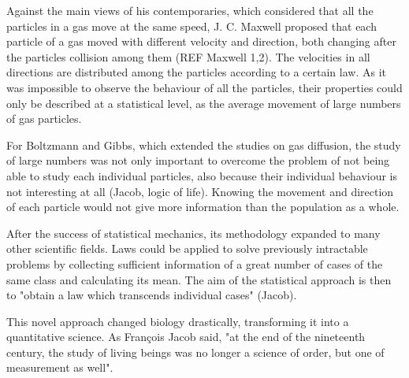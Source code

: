 Against the main views of his contemporaries, which considered that all the particles in a gas move at the same speed, J. C. Maxwell proposed that each particle of a gas moved with different velocity and direction, both changing after the particles collision among them (REF Maxwell 1,2).
The velocities in all directions are distributed among the particles according to a certain law. As it was impossible to observe the behaviour of all the particles, their properties could only be described at a statistical level, as the average movement of large numbers of gas particles.

For Boltzmann and Gibbs, which extended the studies on gas diffusion, the study of large numbers was not only important to overcome the problem of not being able to study each individual particles, also because their individual behaviour is not interesting at all (Jacob, logic of life). Knowing the movement and direction of each particle would not give more information than the population as a whole.

After the success of statistical mechanics, its methodology expanded to many other scientific fields.
Laws could be applied to solve previously intractable problems by collecting sufficient information of a great number of cases of the same class and calculating its mean. The aim of the statistical approach is then to "obtain a law which transcends individual cases" (Jacob).

This novel approach changed biology drastically, transforming it into a quantitative science. As Fran\c{c}ois Jacob said, "at the end of the nineteenth century, the study of living beings was no longer a science of order, but one of measurement as well".




